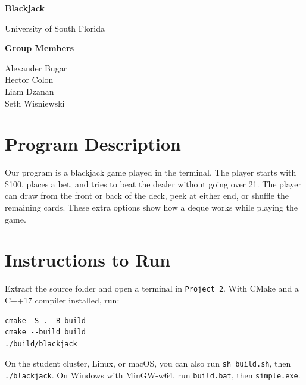 \documentclass[11pt,letterpaper]{article}
\begin{document}
\begin{center}
    {\LARGE\bfseries Blackjack\par}
    \vspace{5pt}
    {\large University of South Florida\par}
    \vspace{10pt}
    {\bfseries Group Members\par}
    Alexander Bugar\\
    Hector Colon\\
    Liam Dzanan\\
    Seth Wisniewski
\end{center}

\section*{Program Description}
Our program is a blackjack game played in the terminal. The player starts with \$100, places a bet, and tries to beat the dealer without going over 21. The player can draw from the front or back of the deck, peek at either end, or shuffle the remaining cards. These extra options show how a deque works while playing the game.

\section*{Instructions to Run}
Extract the source folder and open a terminal in \texttt{Project 2}. With CMake and a C++17 compiler installed, run:
\begin{verbatim}
cmake -S . -B build
cmake --build build
./build/blackjack
\end{verbatim}
On the student cluster, Linux, or macOS, you can also run \texttt{sh build.sh}, then \texttt{./blackjack}. On Windows with MinGW-w64, run \texttt{build.bat}, then \texttt{simple.exe}.
\end{document}
